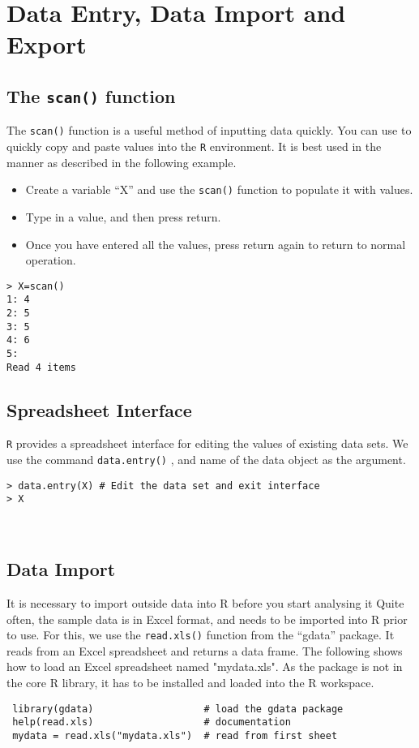 
\section{Data Entry, Data Import and Export}

\subsection{The \texttt{scan()} function}
The \texttt{scan()} function is a useful method of inputting data quickly. You can use to quickly copy and paste values into the \texttt{R} environment.
It is best used in the manner as described in the following example. 

\begin{itemize}
\item Create a variable “X” and use the \texttt{scan()} function to populate it with values.
\item Type in a value, and then press return.
\item Once you have entered all the values, press return again to return to normal operation.
\end{itemize}
\begin{framed}
\begin{verbatim}
> X=scan()
1: 4
2: 5
3: 5
4: 6
5: 
Read 4 items
\end{verbatim}
\end{framed}

\subsection{Spreadsheet Interface}
\texttt{R} provides a spreadsheet interface for editing the values of existing data sets.
We use the command \texttt{data.entry()} , and name of the data object as the argument.
\begin{framed}
\begin{verbatim}
> data.entry(X) # Edit the data set and exit interface
> X
\end{verbatim}
\end{framed}
 
\subsection{Data Import}
It is necessary to import outside data into R before you start analysing it
Quite often, the sample data is in Excel format, and needs to be imported into R prior to use. For this, we use the \texttt{read.xls()} function from the “gdata” package. It reads from an Excel spreadsheet and returns a data frame. The following shows how to load an Excel spreadsheet named "mydata.xls". As the package is not in the core R library, it has to be installed and loaded into the R workspace.
\begin{framed}
\begin{verbatim}
 library(gdata)                   # load the gdata package 
 help(read.xls)                   # documentation 
 mydata = read.xls("mydata.xls")  # read from first sheet
\end{verbatim}
\end{framed}
